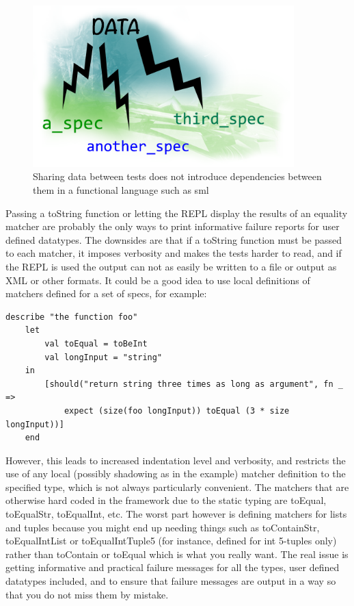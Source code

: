 \documentclass[11pt]{article}
\begin{document}
\begin{figure}[ht!]
\centering
\includegraphics[width=0.9\textwidth]{pics/data.png}
\caption{Sharing data between tests does not introduce dependencies between them in a functional language such as \gls{sml}}
\label{fig:data}
\end{figure}

Passing a toString function or letting the REPL display the results of an equality \gls{matcher} are probably the only ways to print informative failure reports for user defined datatypes. The downsides are that if a toString function must be passed to each \gls{matcher}, it imposes verbosity and makes the tests harder to read, and if the REPL is used the output can not as easily be written to a file or output as XML or other formats. It could be a good idea to use local definitions of \glspl{matcher} defined for a set of specs, for example:

\begin{verbatim}
describe "the function foo"
    let
        val toEqual = toBeInt
        val longInput = "string"
    in
        [should("return string three times as long as argument", fn _ =>
            expect (size(foo longInput)) toEqual (3 * size longInput))]
    end
\end{verbatim}

However, this leads to increased indentation level and verbosity, and restricts the use of any local (possibly shadowing as in the example) \gls{matcher} definition to the specified type, which is not always particularly convenient. The matchers that are otherwise hard coded in the framework due to the static typing are toEqual, toEqualStr, toEqualInt, etc. The worst part however is defining matchers for lists and tuples because you might end up needing things such as toContainStr, toEqualIntList or toEqualIntTuple5 (for instance, defined for int 5-tuples only) rather than toContain or toEqual which is what you really want. The real issue is getting informative and practical failure messages for all the types, user defined datatypes included, and to ensure that failure messages are output in a way so that you do not miss them by mistake.
\end{document}
